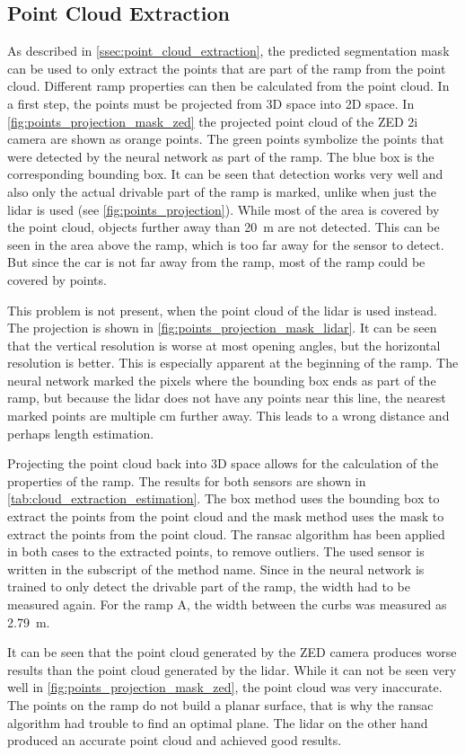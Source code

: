\subsection{Point Cloud Extraction}
As described in \cref{ssec:point_cloud_extraction}, the predicted segmentation mask can be used to only extract the points that are part of the ramp from the point cloud.
Different ramp properties can then be calculated from the point cloud.
In a first step, the points must be projected from 3D space into 2D space.
In \cref{fig:points_projection_mask_zed} the projected point cloud of the ZED 2i camera are shown as orange points.
The green points symbolize the points that were detected by the neural network as part of the ramp.
The blue box is the corresponding bounding box.
It can be seen that detection works very well and also only the actual drivable part of the ramp is marked, unlike when just the \gls{lidar} is used (see \cref{fig:points_projection}).
While most of the area is covered by the point cloud, objects further away than \SI{20}{\metre} are not detected.
This can be seen in the area above the ramp, which is too far away for the sensor to detect.
But since the car is not far away from the ramp, most of the ramp could be covered by points.\par
This problem is not present, when the point cloud of the \gls{lidar} is used instead.
The projection is shown in \cref{fig:points_projection_mask_lidar}.
It can be seen that the vertical resolution is worse at most opening angles, but the horizontal resolution is better.
This is especially apparent at the beginning of the ramp.
The neural network marked the pixels where the bounding box ends as part of the ramp, but because the \gls{lidar} does not have any points near this line, the nearest marked points are multiple \si{\cm} further away.
This leads to a wrong distance and perhaps length estimation.\par
Projecting the point cloud back into 3D space allows for the calculation of the properties of the ramp.
The results for both sensors are shown in \cref{tab:cloud_extraction_estimation}.
The box method uses the bounding box to extract the points from the point cloud and the mask method uses the mask to extract the points from the point cloud.
The \gls{ransac} algorithm has been applied in both cases to the extracted points, to remove outliers.
The used sensor is written in the subscript of the method name.
Since in the neural network is trained to only detect the drivable part of the ramp, the width had to be measured again.
For the ramp A, the width between the curbs was measured as \SI{2.79}{\metre}.\par
It can be seen that the point cloud generated by the ZED camera produces worse results than the point cloud generated by the lidar.
While it can not be seen very well in \cref{fig:points_projection_mask_zed}, the point cloud was very inaccurate.
The points on the ramp do not build a planar surface, that is why the \gls{ransac} algorithm had trouble to find an optimal plane.
The \gls{lidar} on the other hand produced an accurate point cloud and achieved good results.

